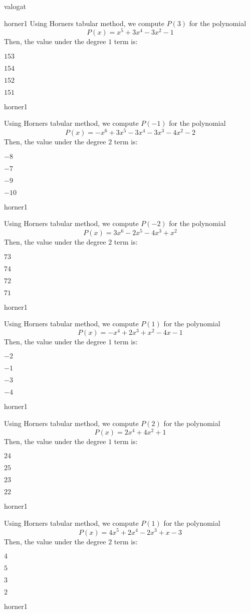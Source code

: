 \documentclass[12pt]{article}
\begin{document}
\begin{quiz}{valogat}
\begin{multi}{horner1}
Using Horners tabular method, we compute $P(3)$ for the polynomial
$$P(x)=x^5+3x^4-3x^2-1$$
Then, the value under the degree $1$ term is:
\item* $ 153 $
\item  $ 154 $
\item  $ 152 $
\item  $ 151 $
\end{multi}
\begin{multi}{horner1}

Using Horners tabular method, we compute $P(-1)$ for the polynomial
$$P(x)=-x^6+3x^5-3x^4-3x^3-4x^2-2$$
Then, the value under the degree $2$ term is:
\item* $ -8 $
\item  $ -7 $
\item  $ -9 $
\item  $ -10 $
\end{multi}
\begin{multi}{horner1}

Using Horners tabular method, we compute $P(-2)$ for the polynomial
$$P(x)=3x^6-2x^5-4x^3+x^2$$
Then, the value under the degree $2$ term is:
\item* $ 73 $
\item  $ 74 $
\item  $ 72 $
\item  $ 71 $
\end{multi}
\begin{multi}{horner1}

Using Horners tabular method, we compute $P(1)$ for the polynomial
$$P(x)=-x^4+2x^3+x^2-4x-1$$
Then, the value under the degree $1$ term is:
\item* $ -2 $
\item  $ -1 $
\item  $ -3 $
\item  $ -4 $
\end{multi}
\begin{multi}{horner1}

Using Horners tabular method, we compute $P(2)$ for the polynomial
$$P(x)=2x^4+4x^2+1$$
Then, the value under the degree $1$ term is:
\item* $ 24 $
\item  $ 25 $
\item  $ 23 $
\item  $ 22 $
\end{multi}
\begin{multi}{horner1}

Using Horners tabular method, we compute $P(1)$ for the polynomial
$$P(x)=4x^5+2x^4-2x^3+x-3$$
Then, the value under the degree $2$ term is:
\item* $ 4 $
\item  $ 5 $
\item  $ 3 $
\item  $ 2 $
\end{multi}
\begin{multi}{horner1}


\end{multi}
\end{quiz}
\end{document}
